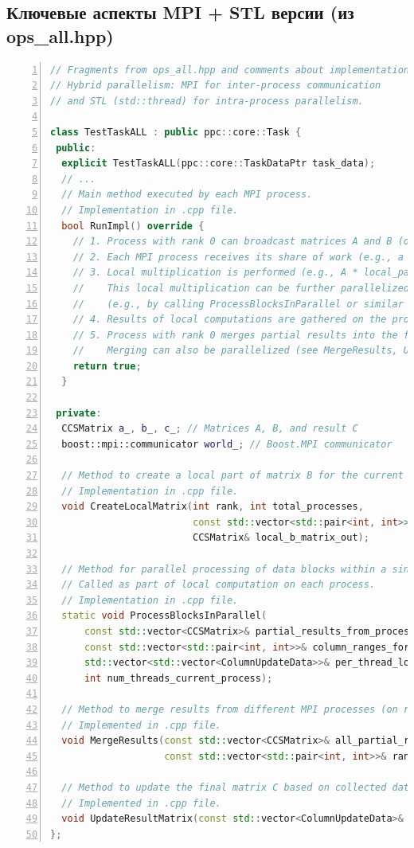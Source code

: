 \documentclass[12pt]{article}
\begin{document}
\subsection*{Ключевые аспекты MPI + STL версии (из ops\_all.hpp)}
\begin{lstlisting}[language=C++, numbers=left, caption=Структура для гибридного параллелизма MPI + STL]
// Fragments from ops_all.hpp and comments about implementation in .cpp.
// Hybrid parallelism: MPI for inter-process communication
// and STL (std::thread) for intra-process parallelism.

class TestTaskALL : public ppc::core::Task {
 public:
  explicit TestTaskALL(ppc::core::TaskDataPtr task_data);
  // ...
  // Main method executed by each MPI process.
  // Implementation in .cpp file.
  bool RunImpl() override {
    // 1. Process with rank 0 can broadcast matrices A and B (or parts of them) to other processes (MPI_Bcast/MPI_Scatter).
    // 2. Each MPI process receives its share of work (e.g., a range of columns of matrix B).
    // 3. Local multiplication is performed (e.g., A * local_part_of_B).
    //    This local multiplication can be further parallelized using std::thread
    //    (e.g., by calling ProcessBlocksInParallel or similar logic).
    // 4. Results of local computations are gathered on the process with rank 0 (MPI_Gather/MPI_Reduce).
    // 5. Process with rank 0 merges partial results into the final matrix C.
    //    Merging can also be parallelized (see MergeResults, UpdateResultMatrix).
    return true;
  }

 private:
  CCSMatrix a_, b_, c_; // Matrices A, B, and result C
  boost::mpi::communicator world_; // Boost.MPI communicator

  // Method to create a local part of matrix B for the current MPI process.
  // Implementation in .cpp file.
  void CreateLocalMatrix(int rank, int total_processes,
                         const std::vector<std::pair<int, int>>& all_local_cols_ranges,
                         CCSMatrix& local_b_matrix_out);

  // Method for parallel processing of data blocks within a single MPI process using STL threads.
  // Called as part of local computation on each process.
  // Implementation in .cpp file.
  static void ProcessBlocksInParallel(
      const std::vector<CCSMatrix>& partial_results_from_processes, // or input data for the local stage
      const std::vector<std::pair<int, int>>& column_ranges_for_threads,
      std::vector<std::vector<ColumnUpdateData>>& per_thread_local_updates,
      int num_threads_current_process);

  // Method to merge results from different MPI processes (on rank 0).
  // Implemented in .cpp file.
  void MergeResults(const std::vector<CCSMatrix>& all_partial_results,
                    const std::vector<std::pair<int, int>>& ranges_of_partial_results);
  
  // Method to update the final matrix C based on collected data.
  // Implemented in .cpp file.
  void UpdateResultMatrix(const std::vector<ColumnUpdateData>& all_updates_for_final_matrix_c);
};
\end{lstlisting}
\end{document}

